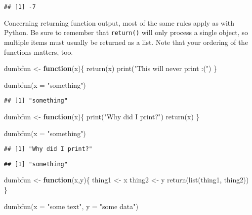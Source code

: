 \documentclass[
]{book}
\newenvironment{Shaded}{\begin{snugshade}}{\end{snugshade}}
\newcommand{\AttributeTok}[1]{\textcolor[rgb]{0.77,0.63,0.00}{#1}}
\newcommand{\ControlFlowTok}[1]{\textcolor[rgb]{0.13,0.29,0.53}{\textbf{#1}}}
\newcommand{\FunctionTok}[1]{\textcolor[rgb]{0.00,0.00,0.00}{#1}}
\newcommand{\NormalTok}[1]{#1}
\newcommand{\OtherTok}[1]{\textcolor[rgb]{0.56,0.35,0.01}{#1}}
\newcommand{\StringTok}[1]{\textcolor[rgb]{0.31,0.60,0.02}{#1}}
\begin{document}
\begin{verbatim}
## [1] -7
\end{verbatim}

Concerning returning function output, most of the same rules apply as with Python. Be sure to remember that \texttt{return()} will only process a single object, so multiple items must usually be returned as a list. Note that your ordering of the functions matters, too.

\begin{Shaded}
\begin{Highlighting}[]
\NormalTok{dumbfun }\OtherTok{\textless{}{-}} \ControlFlowTok{function}\NormalTok{(x)\{}
  \FunctionTok{return}\NormalTok{(x)}
  \FunctionTok{print}\NormalTok{(}\StringTok{"This will never print :("}\NormalTok{)}
\NormalTok{\}}

\FunctionTok{dumbfun}\NormalTok{(}\AttributeTok{x =} \StringTok{"something"}\NormalTok{)}
\end{Highlighting}
\end{Shaded}

\begin{verbatim}
## [1] "something"
\end{verbatim}

\begin{Shaded}
\begin{Highlighting}[]
\NormalTok{dumbfun }\OtherTok{\textless{}{-}} \ControlFlowTok{function}\NormalTok{(x)\{}
  \FunctionTok{print}\NormalTok{(}\StringTok{"Why did I print?"}\NormalTok{)}
  \FunctionTok{return}\NormalTok{(x)}
\NormalTok{\}}

\FunctionTok{dumbfun}\NormalTok{(}\AttributeTok{x =} \StringTok{"something"}\NormalTok{)}
\end{Highlighting}
\end{Shaded}

\begin{verbatim}
## [1] "Why did I print?"
\end{verbatim}

\begin{verbatim}
## [1] "something"
\end{verbatim}

\begin{Shaded}
\begin{Highlighting}[]
\NormalTok{dumbfun }\OtherTok{\textless{}{-}} \ControlFlowTok{function}\NormalTok{(x,y)\{}
\NormalTok{  thing1 }\OtherTok{\textless{}{-}}\NormalTok{ x}
\NormalTok{  thing2 }\OtherTok{\textless{}{-}}\NormalTok{ y}
  \FunctionTok{return}\NormalTok{(}\FunctionTok{list}\NormalTok{(thing1, thing2))}
\NormalTok{\}}

\FunctionTok{dumbfun}\NormalTok{(}\AttributeTok{x =} \StringTok{"some text"}\NormalTok{, }\AttributeTok{y =} \StringTok{"some data"}\NormalTok{)}
\end{Highlighting}
\end{Shaded}
\end{document}
